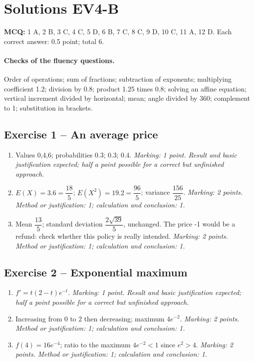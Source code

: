 \clearpage\section*{Solutions EV4-B}\label{EV4-B-CORR}
\textbf{MCQ:} 1 A, 2 B, 3 C, 4 C, 5 D, 6 B, 7 C, 8 C, 9 D, 10 C, 11 A, 12 D. Each correct answer: 0.5 point; total 6.
\paragraph{Checks of the fluency questions.} Order of operations; sum of fractions; subtraction of exponents; multiplying coefficient 1.2; division by 0.8; product 1.25 times 0.8; solving an affine equation; vertical increment divided by horizontal; mean; angle divided by 360; complement to 1; substitution in brackets.
\subsection*{Exercise 1 -- An average price}
\begin{enumerate}
\item Values 0,4,6; probabilities 0.3; 0.3; 0.4. \textit{Marking: 1 point. Result and basic justification expected; half a point possible for a correct but unfinished approach.}
\item $E(X)=3.6=\dfrac{18}{5}$; $E(X^2)=19.2=\dfrac{96}{5}$; variance $\dfrac{156}{25}$. \textit{Marking: 2 points. Method or justification: 1; calculation and conclusion: 1.}
\item Mean $\dfrac{13}{5}$; standard deviation $\dfrac{2\sqrt {39}}{5}$, unchanged. The price -1 would be a refund: check whether this policy is really intended. \textit{Marking: 2 points. Method or justification: 1; calculation and conclusion: 1.}
\end{enumerate}
\subsection*{Exercise 2 -- Exponential maximum}
\begin{enumerate}
\item $f\prime=t(2-t)e^{-t}$. \textit{Marking: 1 point. Result and basic justification expected; half a point possible for a correct but unfinished approach.}
\item Increasing from 0 to 2 then decreasing; maximum $4e^{-2}$. \textit{Marking: 2 points. Method or justification: 1; calculation and conclusion: 1.}
\item $f(4)=16e^{-4}$; ratio to the maximum $4e^{-2}<1$ since $e^2>4$. \textit{Marking: 2 points. Method or justification: 1; calculation and conclusion: 1.}
\end{enumerate}
